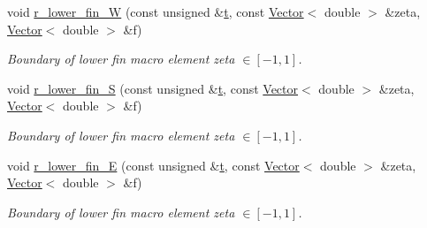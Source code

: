 \begin{DoxyCompactItemize}
void \hyperlink{classoomph_1_1FishDomain_aaf5f3eb1842dc9d7e3f51d4b727632f9}{r\+\_\+lower\+\_\+fin\+\_\+W} (const unsigned \&\hyperlink{cfortran_8h_af6f0bd3dc13317f895c91323c25c2b8f}{t}, const \hyperlink{classoomph_1_1Vector}{Vector}$<$ double $>$ \&zeta, \hyperlink{classoomph_1_1Vector}{Vector}$<$ double $>$ \&f)
\begin{DoxyCompactList}\small\item\em Boundary of lower fin macro element zeta $ \in [-1,1] $. \end{DoxyCompactList}\item 
void \hyperlink{classoomph_1_1FishDomain_a2110fb0b776654460d6a3477fbc4979d}{r\+\_\+lower\+\_\+fin\+\_\+S} (const unsigned \&\hyperlink{cfortran_8h_af6f0bd3dc13317f895c91323c25c2b8f}{t}, const \hyperlink{classoomph_1_1Vector}{Vector}$<$ double $>$ \&zeta, \hyperlink{classoomph_1_1Vector}{Vector}$<$ double $>$ \&f)
\begin{DoxyCompactList}\small\item\em Boundary of lower fin macro element zeta $ \in [-1,1] $. \end{DoxyCompactList}\item 
void \hyperlink{classoomph_1_1FishDomain_a956dcbb87e9b37a0b965fcddb9911de3}{r\+\_\+lower\+\_\+fin\+\_\+E} (const unsigned \&\hyperlink{cfortran_8h_af6f0bd3dc13317f895c91323c25c2b8f}{t}, const \hyperlink{classoomph_1_1Vector}{Vector}$<$ double $>$ \&zeta, \hyperlink{classoomph_1_1Vector}{Vector}$<$ double $>$ \&f)
\begin{DoxyCompactList}\small\item\em Boundary of lower fin macro element zeta $ \in [-1,1] $. \end{DoxyCompactList}\end{DoxyCompactItemize}
